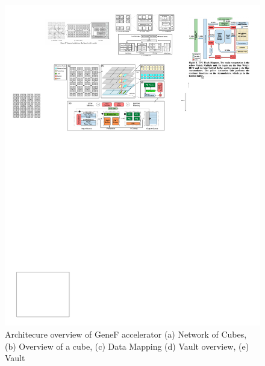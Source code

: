 \documentclass[9pt,conference]{IEEEtran}
\begin{document}
\begin{figure}[t]
\centering
\includegraphics[scale=0.35]{fig/hpca20-v4.pdf}
\caption{Architecure overview of GeneF accelerator (a) Network of Cubes, (b) Overview of a cube, (c) Data Mapping (d) Vault overview, (e) Vault}
\label{fig:arch_design}
\end{figure}

\end{document}
